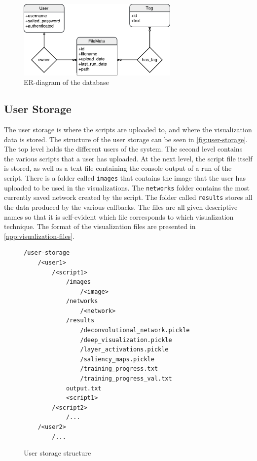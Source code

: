 \begin{figure}[h!]
    \centering
        \includegraphics[width=0.7\textwidth]{fig/database-diagram.pdf}
        \caption{ER-diagram of the database}
        \label{fig:database-diagram}
\end{figure}

\subsection{User Storage} \label{sec:user-storage}

The user storage is where the scripts are uploaded to, and where the visualization data is stored. The structure of the user storage can be seen in \autoref{fig:user-storage}. The top level holds the different users of the system. The second level contains the various scripts that a user has uploaded. At the next level, the script file itself is stored, as well as a text file containing the console output of a run of the script. There is a folder called \texttt{images} that contains the image that the user has uploaded to be used in the visualizations. The \texttt{networks} folder contains the most currently saved network created by the script. The folder called \texttt{results} stores all the data produced by the various callbacks. The files are all given descriptive names so that it is self-evident which file corresponds to which visualization technique. The format of the visualization files are presented in \autoref{app:visualization-files}.

\begin{figure}[h!]
\begin{verbatim}
/user-storage
    /<user1>
        /<script1>
            /images
                /<image>
            /networks
                /<network>
            /results
                /deconvolutional_network.pickle
                /deep_visualization.pickle
                /layer_activations.pickle
                /saliency_maps.pickle
                /training_progress.txt
                /training_progress_val.txt
            output.txt
            <script1>
        /<script2>
            /...
    /<user2>
        /...
\end{verbatim}
\caption{User storage structure}
\label{fig:user-storage}
\end{figure}

